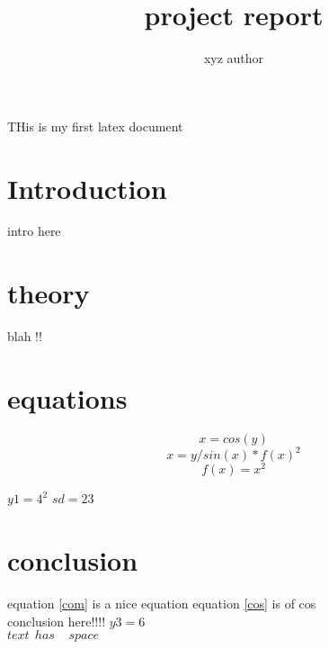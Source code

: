 \documentclass{article}
\title{project report}
\author{xyz author}
\begin{document}
\maketitle
\tableofcontents
\newpage
THis is my first latex document
\section{Introduction}
intro here
\section{theory}
blah !!
\section{equations}
\begin{equation}
	x=cos(y)
	\label{cos}
\end{equation}
\begin{equation}
	x=y/sin(x) * f(x)^2
	\label{com}
\end{equation}
	\[ f(x) = x^2 \]  
	
	
	\( y1 = 4^2 \)
	\(sd= 23 \)
\section{conclusion}
equation \ref{com} is a nice equation \newline
equation \ref{cos} is of cos \\
conclusion here!!!!
\newpage
$y3=6$\\
$text \ \ has \  \ \ \ \ space$
\end{document}
